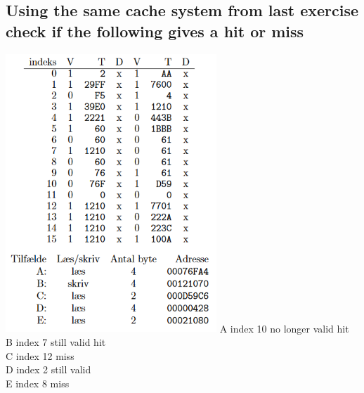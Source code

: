 \documentclass[12pt, a4paper]{article}
\begin{document}
		\subsection{Using the same cache system from last exercise check if the following gives a hit or miss}
			\includegraphics[width=300px]{assets/cacheHistory.png}
			A index 10 no longer valid hit\\
			B index 7 still valid hit\\
			C index 12 miss\\
			D index 2 still valid\\
			E index 8 miss
			
\end{document}
